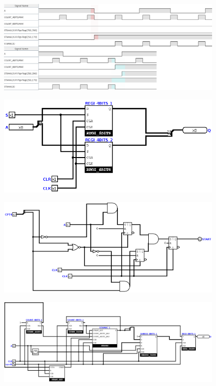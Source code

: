 \documentclass[a4paper]{article} %
\begin{document}
\begin{figure}[H]
\centering
    \includegraphics[width=1\textwidth]{src/CHRONO_STAMAC_4_colorized.png}
    \label{fig:chrono_stamac}
\end{figure}

\begin{figure}[H]
\centering
    \includegraphics[width=1\textwidth]{src/REGI_8BITS}
    \label{fig:regi8bits}
\end{figure}

\begin{figure}[H]
\centering
    \includegraphics[width=1\textwidth]{src/START_BIT.png}
    \label{fig:startbit}
\end{figure}

\begin{figure}[H]
    \includegraphics[width=1.5\textwidth]{src/UART.png}
    \label{fig:uartPLus}
    
\end{figure}
\end{document}
